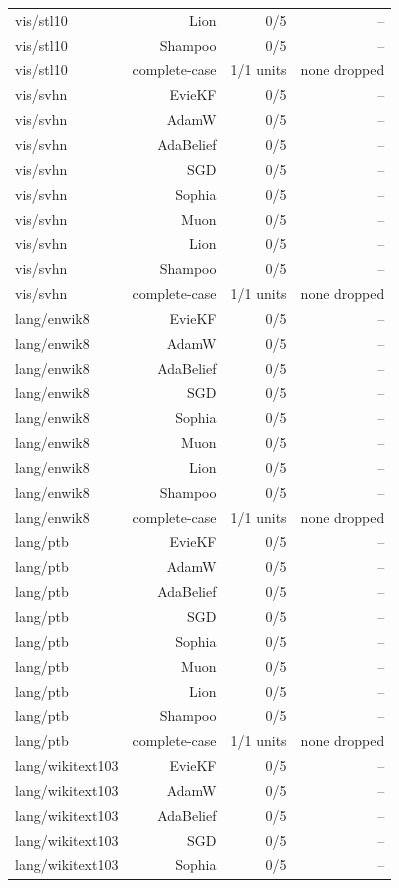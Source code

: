\begin{table}[t]
\begin{tabular}{lrrr}
vis/stl10 & Lion & 0/5 & -- \\
vis/stl10 & Shampoo & 0/5 & -- \\
vis/stl10 & complete-case & 1/1 units & none dropped \\
vis/svhn & EvieKF & 0/5 & -- \\
vis/svhn & AdamW & 0/5 & -- \\
vis/svhn & AdaBelief & 0/5 & -- \\
vis/svhn & SGD & 0/5 & -- \\
vis/svhn & Sophia & 0/5 & -- \\
vis/svhn & Muon & 0/5 & -- \\
vis/svhn & Lion & 0/5 & -- \\
vis/svhn & Shampoo & 0/5 & -- \\
vis/svhn & complete-case & 1/1 units & none dropped \\
lang/enwik8 & EvieKF & 0/5 & -- \\
lang/enwik8 & AdamW & 0/5 & -- \\
lang/enwik8 & AdaBelief & 0/5 & -- \\
lang/enwik8 & SGD & 0/5 & -- \\
lang/enwik8 & Sophia & 0/5 & -- \\
lang/enwik8 & Muon & 0/5 & -- \\
lang/enwik8 & Lion & 0/5 & -- \\
lang/enwik8 & Shampoo & 0/5 & -- \\
lang/enwik8 & complete-case & 1/1 units & none dropped \\
lang/ptb & EvieKF & 0/5 & -- \\
lang/ptb & AdamW & 0/5 & -- \\
lang/ptb & AdaBelief & 0/5 & -- \\
lang/ptb & SGD & 0/5 & -- \\
lang/ptb & Sophia & 0/5 & -- \\
lang/ptb & Muon & 0/5 & -- \\
lang/ptb & Lion & 0/5 & -- \\
lang/ptb & Shampoo & 0/5 & -- \\
lang/ptb & complete-case & 1/1 units & none dropped \\
lang/wikitext103 & EvieKF & 0/5 & -- \\
lang/wikitext103 & AdamW & 0/5 & -- \\
lang/wikitext103 & AdaBelief & 0/5 & -- \\
lang/wikitext103 & SGD & 0/5 & -- \\
lang/wikitext103 & Sophia & 0/5 & -- \\

\end{tabular}
\end{table}
